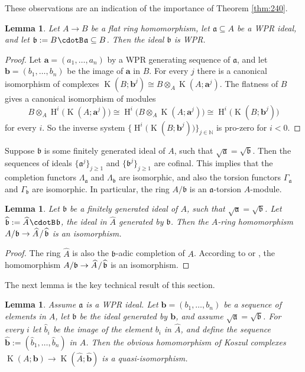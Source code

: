 \documentclass[10pt]{amsart}
\newtheorem{lem}[equation]{Lemma}
\theoremstyle{definition}
\numberwithin{equation}{section}
\newcommand{\sub}{\subseteq}
\newcommand{\opn}{\operatorname}
\newcommand{\cd}{\mspace{1.3mu}{\cdotB}\mspace{1.3mu}}
\newcommand{\mfrak}[1]{\mathfrak{#1}}
\newcommand{\Ga}{\Gamma}
\newcommand{\La}{\Lambda}
\renewcommand{\a}{\mfrak{a}}
\renewcommand{\b}{\mfrak{b}}
\newcommand{\ba}{\bsym{a}}
\newcommand{\bb}{\bsym{b}}
\newcommand{\N}{\mathbb{N}}
\newcommand{\bsym}[1]{\boldsymbol{#1}}
\newcommand{\ot}{\otimes}
\newcommand{\what}[1]{\widehat{#1}}
\newcommand{\msp}[1]{\mspace{#1 mu}}
\begin{document}
These observations are an indication of the importance of Theorem \ref{thm:240}.

\begin{lem} \label{lem:510}
Let $A \to B$ be a flat ring homomorphism, let $\a \sub A$ be a WPR ideal, and
let $\b := B \cd \a \sub B$. Then the ideal $\b$ is WPR.
\end{lem}

\begin{proof}
Let $\bsym{a} = (a_1, \ldots, a_n)$ by a WPR generating sequence of $\a$, and
let $\bsym{b} = (b_1, \ldots, b_n)$ be the image of $\bsym{a}$ in $B$.
For every $j$ there is a canonical isomorphism of complexes
$\opn{K}(B; \bb^{j}) \cong B \ot_A \opn{K}(A; \ba^{j})$.
The flatness of $B$ gives a canonical isomorphism of modules
\[ B \ot_A \opn{H}^i \bigl( \opn{K}(A; \ba^{j}) \bigr) \cong
\opn{H}^i \bigl( B \ot_A \opn{K}(A; \ba^{j}) \bigr) \cong
\opn{H}^i \bigl( \opn{K}(B; \bb^{j}) \bigr) \]
for every $i$. So the inverse system
$\bigl\{ \opn{H}^i \bigl( \opn{K}(B; \bb^{j}) \bigr) \bigr\}_{j \in \N}$
is pro-zero for $i < 0$.
\end{proof}

Suppose $\b$ is some finitely generated ideal of $A$, such that
$\sqrt{\a} = \sqrt{\b}$. Then the sequences of ideals
$\{ \a^j \}_{j \geq 1}$ and $\{ \b^j \}_{j \geq 1}$ are cofinal.
This implies that the completion functors $\La_{\a}$ and $\La_{\b}$ are
isomorphic, and also the torsion functors $\Ga_{\a}$ and $\Ga_{\b}$ are
isomorphic. In particular, the ring $A / \b$ is an $\a$-torsion $A$-module.

\begin{lem} \label{lem:165}
Let $\b$ be a finitely generated ideal of $A$, such that
$\sqrt{\a} = \sqrt{\b}$.
Let $\what{\b} := \what{A} \cd \b$, the ideal in $\what{A}$ generated by $\b$.
Then the $A$-ring homomorphism
$A / \b \to \what{A} \msp{2} / \msp{2} \what{\b}$ is an isomorphism.
\end{lem}

\begin{proof}
The ring $\what{A}$ is also the $\b$-adic completion of $A$.
According to \cite[Theorem 2.8]{Ye4} or
\cite[Corollary 3.6 and Theorem 1.2]{Ye1},
the homomorphism $A / \b \to \what{A} \msp{2} / \msp{2} \what{\b}$ is an
isomorphism.
\end{proof}

The next lemma is the key technical result of this section.

\begin{lem} \label{lem:156}
Assume $\a$ is a WPR ideal.
Let $\bb = (b_1, \ldots, b_n)$ be a sequence of elements in $A$,
let $\b$ be the ideal generated by $\bb$, and assume $\sqrt{\a} = \sqrt{\b}$.
For every $i$ let $\what{b}_i$ be the image of the element $b_i$ in $\what{A}$,
and define the sequence
$\what{\bb} := (\what{b}_1, \ldots, \what{b}_n)$ in $\what{A}$.
Then the obvious homomorphism of Koszul complexes
$\opn{K}(A; \bb) \to \opn{K}(\what{A}; \what{\bb})$ is a quasi-isomorphism.
\end{lem}
\end{document}
